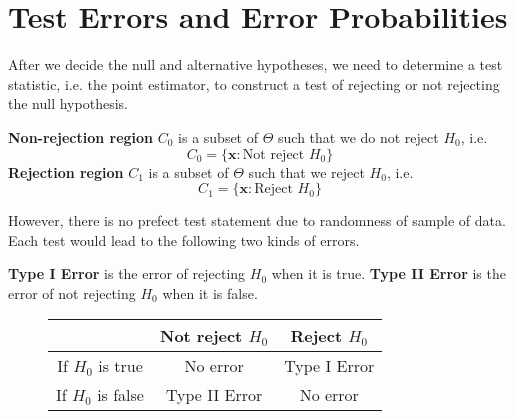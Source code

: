 \documentclass{huhtakm-template-book-v2}
\begin{document}
\section{Test Errors and Error Probabilities}
After we decide the null and alternative hypotheses, we need to determine a test statistic, i.e. the point estimator, to construct a test of rejecting or not rejecting the null hypothesis.
\begin{defn}
	\textbf{Non-rejection region} $C_{0}$ is a subset of $\Theta$ such that we do not reject $H_{0}$, i.e.
	\begin{equation*}
		C_{0}=\{\mathbf{x}:\text{Not reject }H_{0}\}
	\end{equation*}
	\textbf{Rejection region} $C_{1}$ is a subset of $\Theta$ such that we reject $H_{0}$, i.e.
	\begin{equation*}
		C_{1}=\{\mathbf{x}:\text{Reject }H_{0}\}
	\end{equation*}
\end{defn}
However, there is no prefect test statement due to randomness of sample of data. Each test would lead to the following two kinds of errors.
\begin{defn}
	\textbf{Type I Error} is the error of rejecting $H_{0}$ when it is true. \textbf{Type II Error} is the error of not rejecting $H_{0}$ when it is false.
\end{defn}
\begin{figure}[h]
	\centering
	\begin{tabular}{||c|c|c|}
		\hline
		& Not reject $H_{0}$ & Reject $H_{0}$\\
		\hline
		If $H_{0}$ is true & No error & Type I Error\\
		If $H_{0}$ is false & Type II Error & No error\\
		\hline
	\end{tabular}
\end{figure}
\end{document}
